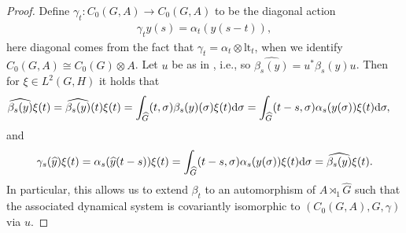\begin{proof}
Define $\gamma_t \colon C_0(G,A) \to C_0(G,A)$ to be the diagonal action
\begin{align*}
\gamma_t y(s) = \alpha_t (y(s-t)),
\end{align*}
here diagonal comes from the fact that $\gamma_t = \alpha_t \otimes \mathrm{lt}_t$, when we identify $C_0(G,A) \cong C_0(G) \otimes A$. Let $u$ be as in , i.e., so $\hat{\beta_s(y)} = u^*\beta_s(y)u$. Then for $\xi \in L^2(G,H)$ it holds that
\begin{align*}
\widehat{\beta_s(y)}\xi(t) = \widehat{\beta_s(y)}(t) \xi(t) = \int_{\widehat{G}} (t, \sigma) \beta_s(y)(\sigma) \xi(t) \mathrm{d} \sigma &= \int_{\widehat{G}} (t-s,\sigma) \alpha_s(y(\sigma)) \xi(t) \mathrm{d} \sigma,
\end{align*}
and
\begin{align*}
\gamma_s (\widehat{y}) \xi(t) = \alpha_{s}(\widehat{y}(t-s)) \xi(t) = \int_{\widehat{G}} (t-s, \sigma) \alpha_s (y (\sigma)) \xi(t) \mathrm{d} \sigma = \widehat{\beta_s(y)} \xi(t).
\end{align*}
In particular, this allows us to extend $\beta_t$ to an automorphism of $A \rtimes_1 \hat G$ such that the associated dynamical system is covariantly isomorphic to $(C_0(G,A),G,\gamma)$ via $u$.


\end{proof}
